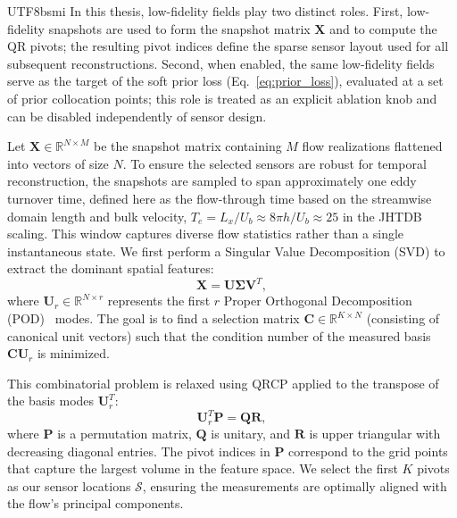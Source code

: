 \documentclass[master]{NTHUthesis}
\begin{document}
\begin{CJK*}{UTF8}{bsmi}
In this thesis, low-fidelity fields play two distinct roles. First, low-fidelity snapshots are used to form the snapshot matrix $\mathbf{X}$ and to compute the QR pivots; the resulting pivot indices define the sparse sensor layout used for all subsequent reconstructions. Second, when enabled, the same low-fidelity fields serve as the target of the soft prior loss (Eq.~\eqref{eq:prior_loss}), evaluated at a set of prior collocation points; this role is treated as an explicit ablation knob and can be disabled independently of sensor design.

Let $\mathbf{X} \in \mathbb{R}^{N \times M}$ be the snapshot matrix containing $M$ flow realizations flattened into vectors of size $N$.
To ensure the selected sensors are robust for temporal reconstruction, the snapshots are sampled to span approximately one eddy turnover time, defined here as the flow-through time based on the streamwise domain length and bulk velocity, $T_e = L_x / U_b \approx 8\pi h / U_b \approx 25$ in the JHTDB scaling. This window captures diverse flow statistics rather than a single instantaneous state.
We first perform a Singular Value Decomposition (SVD) to extract the dominant spatial features:
\begin{equation}
    \mathbf{X} = \mathbf{U} \mathbf{\Sigma} \mathbf{V}^T,
\end{equation}
where $\mathbf{U}_r \in \mathbb{R}^{N \times r}$ represents the first $r$ Proper Orthogonal Decomposition (POD)~\cite{Sirovich1987QAM} modes. The goal is to find a selection matrix $\mathbf{C} \in \mathbb{R}^{K \times N}$ (consisting of canonical unit vectors) such that the condition number of the measured basis $\mathbf{C}\mathbf{U}_r$ is minimized.

This combinatorial problem is relaxed using QRCP applied to the transpose of the basis modes $\mathbf{U}_r^T$:
\begin{equation}
    \mathbf{U}_r^T \mathbf{P} = \mathbf{Q} \mathbf{R},
\end{equation}
where $\mathbf{P}$ is a permutation matrix, $\mathbf{Q}$ is unitary, and $\mathbf{R}$ is upper triangular with decreasing diagonal entries. The pivot indices in $\mathbf{P}$ correspond to the grid points that capture the largest volume in the feature space. We select the first $K$ pivots as our sensor locations $\mathcal{S}$, ensuring the measurements are optimally aligned with the flow's principal components.


\end{CJK*}
\end{document}
